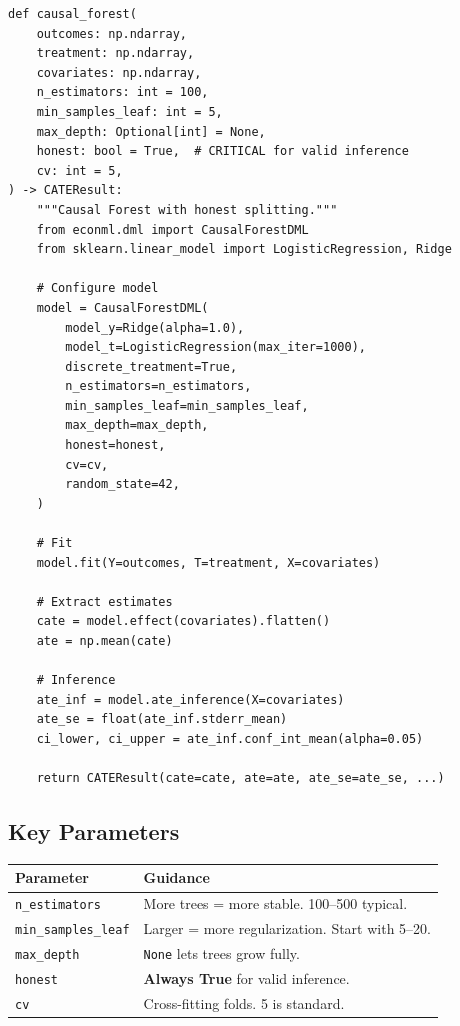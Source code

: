 \begin{verbatim}
def causal_forest(
    outcomes: np.ndarray,
    treatment: np.ndarray,
    covariates: np.ndarray,
    n_estimators: int = 100,
    min_samples_leaf: int = 5,
    max_depth: Optional[int] = None,
    honest: bool = True,  # CRITICAL for valid inference
    cv: int = 5,
) -> CATEResult:
    """Causal Forest with honest splitting."""
    from econml.dml import CausalForestDML
    from sklearn.linear_model import LogisticRegression, Ridge

    # Configure model
    model = CausalForestDML(
        model_y=Ridge(alpha=1.0),
        model_t=LogisticRegression(max_iter=1000),
        discrete_treatment=True,
        n_estimators=n_estimators,
        min_samples_leaf=min_samples_leaf,
        max_depth=max_depth,
        honest=honest,
        cv=cv,
        random_state=42,
    )

    # Fit
    model.fit(Y=outcomes, T=treatment, X=covariates)

    # Extract estimates
    cate = model.effect(covariates).flatten()
    ate = np.mean(cate)

    # Inference
    ate_inf = model.ate_inference(X=covariates)
    ate_se = float(ate_inf.stderr_mean)
    ci_lower, ci_upper = ate_inf.conf_int_mean(alpha=0.05)

    return CATEResult(cate=cate, ate=ate, ate_se=ate_se, ...)
\end{verbatim}

\subsection{Key Parameters}

\begin{center}
\begin{tabular}{lp{8cm}}
\toprule
Parameter & Guidance \\
\midrule
\texttt{n\_estimators} & More trees = more stable. 100--500 typical. \\
\texttt{min\_samples\_leaf} & Larger = more regularization. Start with 5--20. \\
\texttt{max\_depth} & \texttt{None} lets trees grow fully. \\
\texttt{honest} & \textbf{Always True} for valid inference. \\
\texttt{cv} & Cross-fitting folds. 5 is standard. \\
\bottomrule
\end{tabular}
\end{center}

